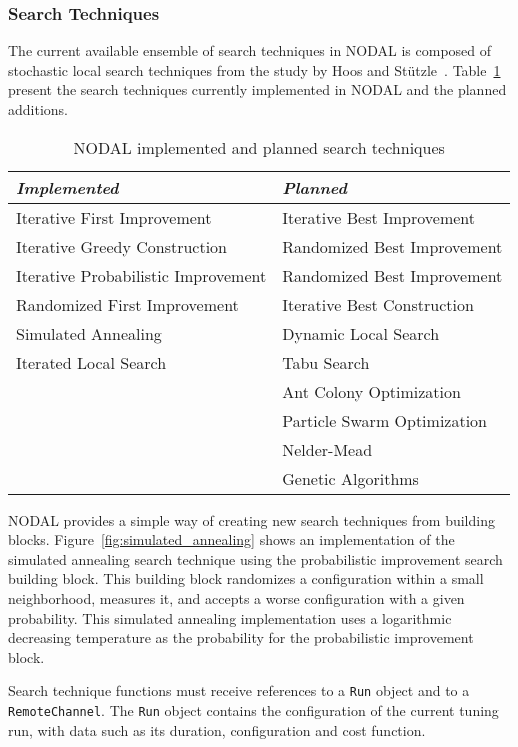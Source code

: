 \subsubsection{Search Techniques}

The current available ensemble of search techniques in NODAL is composed of
stochastic local search techniques from the study by Hoos and
Stützle~\cite{hoos2015stochastic}.  Table~\ref{tab:nodal-techniques} present
the search techniques currently implemented in NODAL and the planned
additions.

\begin{table}[htpb]
\centering
\begin{tabular}{@{}p{}p{}@{}}
\toprule
\textit{Implemented} & \textit{Planned} \\ \midrule
Iterative First Improvement & Iterative Best Improvement \\
Iterative Greedy Construction & Randomized Best Improvement \\
Iterative Probabilistic Improvement & Randomized Best Improvement \\
Randomized First Improvement & Iterative Best Construction \\
Simulated Annealing & Dynamic Local Search \\
Iterated Local Search & Tabu Search \\
 & Ant Colony Optimization \\
 & Particle Swarm Optimization \\
 & Nelder-Mead \\
 & Genetic Algorithms \\ \bottomrule
\end{tabular}
\caption{NODAL implemented and planned search techniques}
\label{tab:nodal-techniques}
\end{table}

NODAL provides a simple way of creating new search techniques from building
blocks. Figure~\ref{fig:simulated_annealing} shows an implementation of the
simulated annealing search technique using the probabilistic improvement search
building block. This building block randomizes a configuration within a small
neighborhood, measures it, and accepts a worse configuration with a given
probability. This simulated annealing implementation uses a logarithmic
decreasing temperature as the probability for the probabilistic improvement
block.

Search technique functions must receive references to a \texttt{Run} object and
to a \texttt{RemoteChannel}.  The \texttt{Run} object contains the
configuration of the current tuning run, with data such as its duration,
configuration and cost function.

